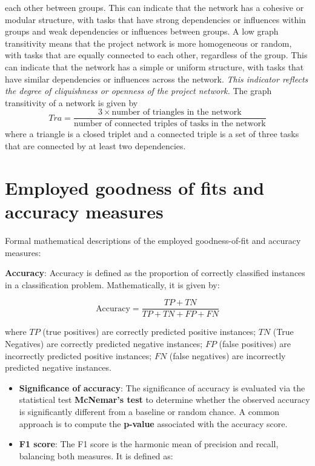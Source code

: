 \documentclass[preprint,
3p]{elsarticle} %
\begin{document}
\begin{appendices}
\begin{itemize}
  each other between groups. This can indicate that the network has a
  cohesive or modular structure, with tasks that have strong
  dependencies or influences within groups and weak dependencies or
  influences between groups. A low graph transitivity means that the
  project network is more homogeneous or random, with tasks that are
  equally connected to each other, regardless of the group. This can
  indicate that the network has a simple or uniform structure, with
  tasks that have similar dependencies or influences across the network.
  \emph{This indicator reflects the degree of cliquishness or openness
  of the project network.} The graph transitivity of a network is given
  by \begin{equation}
  Tra = \frac {3 \times \text{number of triangles in the network}} {\text{number of connected triples of tasks in the network}} \label{eq:Tra}
  \end{equation} \noindent where a triangle is a closed triplet and a
  connected triple is a set of three tasks that are connected by at
  least two dependencies.
\end{itemize}

\section{Employed goodness of fits and accuracy
measures}\label{employed-goodness-of-fits-and-accuracy-measures}

Formal mathematical descriptions of the employed goodness-of-fit and
accuracy measures:

\textbf{Accuracy}: Accuracy is defined as the proportion of correctly
classified instances in a classification problem. Mathematically, it is
given by:

\begin{equation}
    \text{Accuracy} = \frac{TP + TN}{TP + TN + FP + FN}
\end{equation}

\noindent where \(TP\) (true positives) are correctly predicted positive
instances; \(TN\) (True Negatives) are correctly predicted negative
instances; \(FP\) (false positives) are incorrectly predicted positive
instances; \(FN\) (false negatives) are incorrectly predicted negative
instances.

\begin{itemize}
\item
  \textbf{Significance of accuracy}: The significance of accuracy is
  evaluated via the statistical test \textbf{McNemar's test} to
  determine whether the observed accuracy is significantly different
  from a baseline or random chance. A common approach is to compute the
  \textbf{p-value} associated with the accuracy score.
\item
  \textbf{F1 score}: The F1 score is the harmonic mean of precision and
  recall, balancing both measures. It is defined as:
\end{itemize}


\end{appendices}
\end{document}
